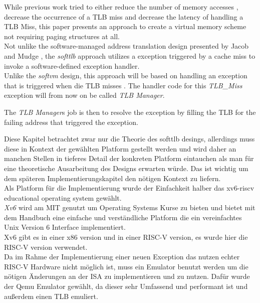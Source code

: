 
While previous work tried to either reduce the number of memory accesses ,
decrease the occurrence of a TLB miss and decrease the latency of handling a TLB Miss, this paper
presents an approach to create a virtual memory scheme not requiring paging structures at all.\\

Not unlike the software-managed address translation design presented by Jacob and Mudge \cite{jacobSoftwaremanagedAddressTranslation1997},
the \textit{softtlb} approach utilizes a exception triggered by a cache miss to invoke a software-defined
exception handler.\\
Unlike the \textit{softvm} design, this approach will be based on handling an exception that is triggered
when die TLB misses .
The handler code for this \textit{TLB\_Miss} exception will from now on be called \textit{TLB Manager}.

The \textit{TLB Manager}s job is then to resolve the exception by filling the TLB for the failing address
that triggered the exception.


Diese Kapitel betrachtet zwar nur die Theorie des softtlb desings, allerdings muss diese in Kontext
der gewählten Platform gestellt werden und wird daher an manchen Stellen in tieferes Detail der konkreten
Platform eintauchen als man für eine theoretische Ausarbeitung des Designs erwarten würde.
Das ist wichtig um dem späteren Implementierungskapitel den nötigen Kontext zu liefern.\\
Als Platform für die Implementierung wurde der Einfachkeit halber das xv6-riscv educational operating
system \cite{cox2011xv6} gewählt.\\
\textit{Xv6} wird am MIT genutzt um Operating Systems Kurse zu bieten und bietet mit dem Handbuch eine
einfache und verständliche Platform die ein vereinfachtes Unix Version 6 Interface implementiert.\\
Xv6 gibt es in einer x86 version und in einer RISC-V version, es wurde hier die RISC-V version verwendet.
\\
Da im Rahme der Implementierung einer neuen Exception das nutzen echter RISC-V Hardware nicht möglich
ist, muss ein Emulator benutzt werden um die nötigen Änderungen an der ISA zu implementieren und zu nutzen.
Dafür wurde der Qemu Emulator gewählt, da dieser sehr Umfassend und performant ist und außerdem einen
TLB emuliert.

